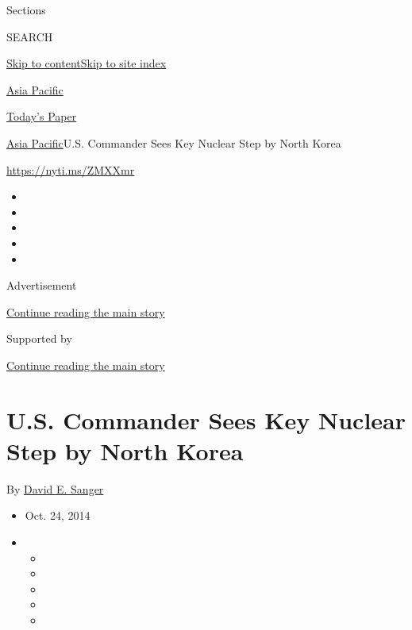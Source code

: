 Sections

SEARCH

\protect\hyperlink{site-content}{Skip to
content}\protect\hyperlink{site-index}{Skip to site index}

\href{https://www.nytimes.com/section/world/asia}{Asia Pacific}

\href{https://myaccount.nytimes.com/auth/login?response_type=cookie\&client_id=vi}{}

\href{https://www.nytimes.com/section/todayspaper}{Today's Paper}

\href{/section/world/asia}{Asia Pacific}\textbar{}U.S. Commander Sees
Key Nuclear Step by North Korea

\url{https://nyti.ms/ZMXXmr}

\begin{itemize}
\item
\item
\item
\item
\item
\end{itemize}

Advertisement

\protect\hyperlink{after-top}{Continue reading the main story}

Supported by

\protect\hyperlink{after-sponsor}{Continue reading the main story}

\hypertarget{us-commander-sees-key-nuclear-step-by-north-korea}{%
\section{U.S. Commander Sees Key Nuclear Step by North
Korea}\label{us-commander-sees-key-nuclear-step-by-north-korea}}

By \href{http://www.nytimes.com/by/david-e-sanger}{David E. Sanger}

\begin{itemize}
\item
  Oct. 24, 2014
\item
  \begin{itemize}
  \item
  \item
  \item
  \item
  \item
  \end{itemize}
\end{itemize}

